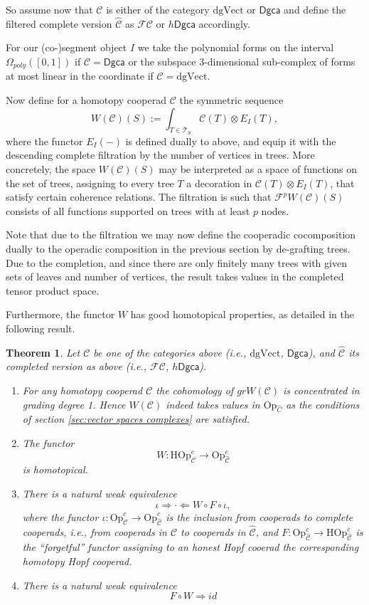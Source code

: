 \documentclass[a4paper]{amsart}
\theoremstyle{plain}
\newtheorem{thm}{Theorem}
\theoremstyle{definition}
\newcommand{\op}{\mathcal}
\newcommand{\dgca}{\mathsf{Dgca}}
\newcommand{\mC}{{\mathcal{C}}}
\newcommand{\mT}{{\mathcal{T}}}
\newcommand{\Hop}{{\mathrm{HOp}}}
\newcommand{\Op}{{\mathrm{Op}}}
\newcommand{\mF}{\mathcal{F}}
\newcommand{\dgVect}{\mathrm{dgVect}}
\newcommand{\FC}{\mathcal{FC}}
\newcommand{\gr}{\mathit{gr}}
\newcommand{\id}{\mathit{id}}
\newcommand{\hdgca}{h\dgca}
\begin{document}
So assume now that $\mC$ is either of the category $\dgVect$ or $\dgca$ and define the filtered complete version $\hat \mC$ as $\FC$ or $\hdgca$ accordingly.

For our (co-)segment object $I$ we take the polynomial forms on the interval $\Omega_{poly}([0,1])$ if $\mC=\dgca$ or the subspace 3-dimensional sub-complex of forms at most linear in the coordinate if $\mC=\dgVect$.

Now define for a homotopy cooperad $\op C$ the symmetric sequence
\[
W(\op C)(S) := \int_{T\in \mT_S} \op C(T)\otimes E_I(T),
\]
where the functor $E_I(-)$ is defined dually to above, and equip it with the descending complete filtration by the number  of vertices in trees.
More concretely, the space $W(\op C)(S)$ may be interpreted as a space of functions on the set of trees, assigning to every tree $T$ a decoration in $\op C(T)\otimes E_I(T)$, that satisfy certain coherence relations.
The filtration is such that $\mF^pW(\op C)(S)$ consists of all functions supported on trees with at least $p$ nodes.

Note that due to the filtration we may now define the cooperadic cocomposition dually to the operadic composition in the previous section by de-grafting trees. Due to the completion, and since there are only finitely many trees with given sets of leaves and number of vertices, the result takes values in the completed tensor product space.

Furthermore, the functor $W$ has good homotopical properties, as detailed in the following result.
\begin{thm}\label{thm:W properties}
Let $\mC$ be one of the categories above (i.e., $\dgVect$, $\dgca$), and $\hat \mC$ its completed version as above (i.e., $\FC$, $\hdgca$).
\begin{enumerate}
\item For any homotopy cooperad $\op C$ the cohomology of $\gr W(\op C)$ is concentrated in grading degree 1.
Hence $W(\op C)$ indeed takes values in $\Op_{\hat C}$ as the conditions of section \ref{sec:vector spaces complexes} are satisfied.
\item The functor 
\[
W\colon  \Hop^c_{\mC} \to \Op^c_{\hat \mC}
\]
is homotopical.
\item There is a natural weak equivalence 
\[
\iota \Rightarrow \cdot \Leftarrow W\circ F\circ \iota,
\]
where the functor $\iota:\Op_{\mC}^c\to \Op^c_{\hat \mC}$ is the inclusion from cooperads to complete cooperads, i.e., from cooperads in $\mC$ to cooperads in $\hat \mC$, and $F:\Op^c_{\hat \mC}\to \Hop^c_{\hat \mC}$ is the ``forgetful'' functor assigning to an honest Hopf cooerad the corresponding homotopy Hopf cooperad. 
\item There is a natural weak equivalence
\[
F\circ W \Rightarrow \id
\]
\end{enumerate}
\end{thm}
\end{document}
